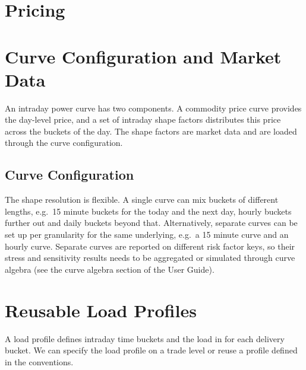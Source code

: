 \documentclass[12pt, a4paper]{article}
\begin{document}
\section{Pricing}



\section{Curve Configuration and Market Data}

An intraday power curve has two components. A commodity price curve provides the day-level price, and a
set of intraday shape factors distributes this price across the buckets of the day. The shape factors are market data
and are loaded through the curve configuration.

\subsection{Curve Configuration}





The shape resolution is flexible. A single curve can mix buckets of different lengths, e.g.\ 15 minute buckets for the today and the
next day, hourly buckets further out and daily buckets beyond that. Alternatively, separate curves can be set up per
granularity for the same underlying, e.g.\ a 15 minute curve and an hourly curve. Separate curves are reported on
different risk factor keys, so their stress and sensitivity results needs to be aggregated or simulated through curve algebra (see the curve algebra section of the User Guide).

\section{Reusable Load Profiles}

A load profile defines intraday time buckets and the load in for each delivery bucket. We can specify the load profile on a trade level 
or reuse a profile defined in the conventions.
\end{document}

